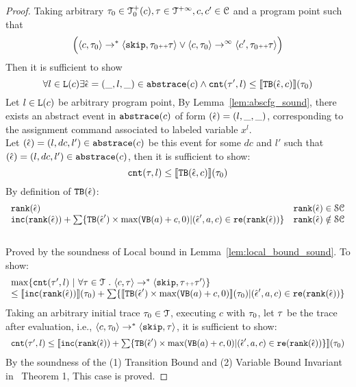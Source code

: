 \begin{proof}
  Taking arbitrary $\mathtt{\tau}_0 \in \mathcal{T}^{+}_0(c), \mathtt{\tau} \in \mathcal{T}^{+\infty}, c, c' \in \mathcal{C}$ and a program point
  such that
  \[
    \Big( \langle c, \mathtt{\tau}_0 \rangle \rightarrow^{*} \langle \mathtt{skip}, \mathtt{\tau}_0 {\scriptscriptstyle ++} \mathtt{\tau} \rangle 
    \lor  \langle c, \mathtt{\tau}_0 \rangle \rightarrow^{\infty} \langle c', \mathtt{\tau}_0 {\scriptscriptstyle ++} \mathtt{\tau} \rangle \Big)
  \]
  Then it is sufficient to show 
  \[
    \forall l \in \mathtt{L}(c) \exists \hat{\mathtt{\epsilon}{}} = (\_, l, \_) \in \mathtt{abs}{\mathtt{trace}}(c) \land
    \mathtt{cnt}(\mathtt{\tau}', l) \leq \llbracket {\ensuremath{\mathtt{TB}}}(\hat{\mathtt{\epsilon}{}}, c) \rrbracket(\mathtt{\tau}_0)
  \]
  Let $l \in \mathtt{L}(c)$ be arbitrary program point,
  By Lemma~\ref{lem:abscfg_sound}, there exists an abstract event in $\mathtt{abs}{\mathtt{trace}}(c)$ of form $(\hat{\mathtt{\epsilon}{}}) = (l, \_, \_)$,
  corresponding to the assignment command associated to labeled variable $x^l$. 
  \\
  Let $(\hat{\mathtt{\epsilon}{}}) = (l, dc, l') \in \mathtt{abs}{\mathtt{trace}}(c)$ be this event for some $dc$ and $l'$ such that  $(\hat{\mathtt{\epsilon}{}}) = (l, dc, l') \in \mathtt{abs}{\mathtt{trace}}(c)$,
   then it is sufficient to show:
  \[
    \mathtt{cnt}(\mathtt{\tau}, l) \leq \llbracket {\ensuremath{\mathtt{TB}}}(\hat{\mathtt{\epsilon}{}}, c) \rrbracket(\mathtt{\tau}_0)
  \]
  By definition of ${\mathtt{TB}}(\hat{\mathtt{\epsilon}{}})$:
  \[
 \begin{array}{ll}
  \mathtt{rank}(\hat{\mathtt{\epsilon}{}}) & \mathtt{rank}(\hat{\mathtt{\epsilon}{}}) \in \mathcal{SC} \\
  \mathtt{inc}(\mathtt{rank}(\hat{\mathtt{\epsilon}{}})) + 
  \sum\{{\mathtt{TB}}(\hat{\mathtt{\epsilon}{}}') \times \max({\mathtt{VB}}(a) + c, 0) | (\hat{\mathtt{\epsilon}{}}', a, c) \in \mathtt{re}(\mathtt{rank}(\hat{\mathtt{\epsilon}{}}))\} 
  & \mathtt{rank}(\hat{\mathtt{\epsilon}{}}) \notin \mathcal{SC}
\end{array}
\]
  \caseL{$\locbound(\absevent) \in \constdom$}
  \\
  Proved by the soundness of Local bound in Lemma~\ref{lem:local_bound_sound}.
  \caseL{$\locbound(\absevent) \notin \constdom$}
To show:
\[
  \begin{array}{l}
    \max \left\{ \counter(\vtrace',  l) ~ \middle\vert~
\forall \vtrace \in \mathcal{T} \st \config{{c}, \trace} \to^{*} \config{\eskip, \trace\tracecat\vtrace'} \right\} 
\\
\leq 
\econfig{\inc(\locbound(\absevent))}(\trace_0) + 
\sum\{\econfig{\absclr(\absevent') \times \max(\varinvar(a) + c, 0)}(\trace_0) | (\absevent', a, c) \in \reset(\locbound(\absevent))\} 
\end{array}
\]
  Taking an arbitrary initial trace
  $\mathtt{\tau}_0 \in \mathcal{T}$, 
  executing $c$ with $\mathtt{\tau}_0$, let $\mathtt{\tau}$ be the trace after evaluation, i.e., $\langle {c}, \mathtt{\tau}_0 \rangle \to^{*} \langle \mathtt{skip},\mathtt{\tau} \rangle$, it is sufficient to show:
  \[ 
    \begin{array}{l}
      \mathtt{cnt}(\mathtt{\tau}',  l) \leq 
    \llbracket \mathtt{inc}(\mathtt{rank}(\hat{\mathtt{\epsilon}{}})) + 
    \sum\{{\mathtt{TB}}(\hat{\mathtt{\epsilon}{}}') \times \max({\mathtt{VB}}(a) + c, 0) | (\hat{\mathtt{\epsilon}{}}', a, c) \in \mathtt{re}(\mathtt{rank}(\hat{\mathtt{\epsilon}{}}))\} \rrbracket(\mathtt{\tau}_0)
  \end{array}
  \]
%
 By the soundness of the (1) Transition Bound and (2) Variable Bound Invariant 
 in~\cite{sinn2017complexity} Theorem 1, 
This case is proved.
\end{proof}


%